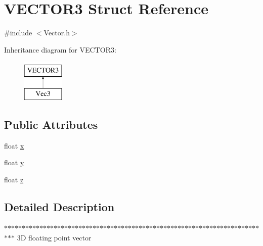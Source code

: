 \hypertarget{struct_v_e_c_t_o_r3}{
\section{VECTOR3 Struct Reference}
\label{struct_v_e_c_t_o_r3}
}


{\ttfamily \#include $<$Vector.h$>$}

Inheritance diagram for VECTOR3:\begin{figure}[H]
\begin{center}
\leavevmode
\includegraphics[height=2.000000cm]{struct_v_e_c_t_o_r3}
\end{center}
\end{figure}
\subsection*{Public Attributes}
\begin{DoxyCompactItemize}
\item 
float \hyperlink{struct_v_e_c_t_o_r3_a7bfb16208db9a4400c62edafb28811d8}{x}
\item 
float \hyperlink{struct_v_e_c_t_o_r3_af7864f671d892d707a1ef6d9c04975bb}{y}
\item 
float \hyperlink{struct_v_e_c_t_o_r3_a7cf8283bcb19b8ed92cd4c7e589e5ab3}{z}
\end{DoxyCompactItemize}


\subsection{Detailed Description}
$\ast$$\ast$$\ast$$\ast$$\ast$$\ast$$\ast$$\ast$$\ast$$\ast$$\ast$$\ast$$\ast$$\ast$$\ast$$\ast$$\ast$$\ast$$\ast$$\ast$$\ast$$\ast$$\ast$$\ast$$\ast$$\ast$$\ast$$\ast$$\ast$$\ast$$\ast$$\ast$$\ast$$\ast$$\ast$$\ast$$\ast$$\ast$$\ast$$\ast$$\ast$$\ast$$\ast$$\ast$$\ast$$\ast$$\ast$$\ast$$\ast$$\ast$$\ast$$\ast$$\ast$$\ast$$\ast$$\ast$$\ast$$\ast$$\ast$$\ast$$\ast$$\ast$$\ast$$\ast$$\ast$$\ast$$\ast$$\ast$$\ast$$\ast$$\ast$$\ast$$\ast$$\ast$$\ast$ 3D floating point vector 

